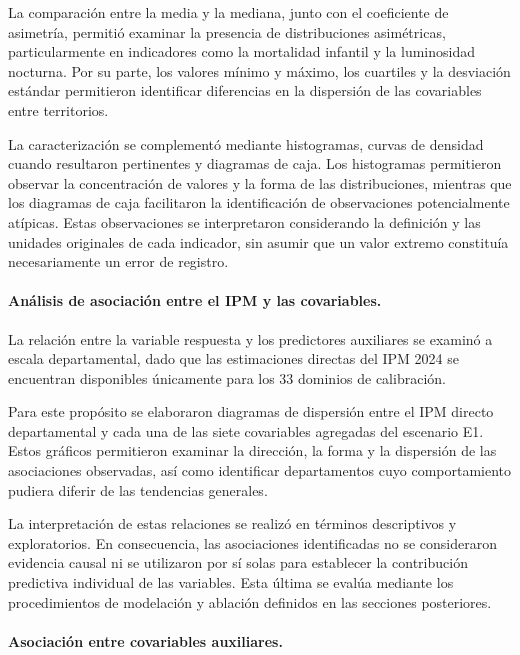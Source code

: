 La comparación entre la media y la mediana, junto con el coeficiente de asimetría, permitió examinar la presencia de distribuciones asimétricas, particularmente en indicadores como la mortalidad infantil y la luminosidad nocturna. Por su parte, los valores mínimo y máximo, los cuartiles y la desviación estándar permitieron identificar diferencias en la dispersión de las covariables entre territorios.

La caracterización se complementó mediante histogramas, curvas de densidad cuando resultaron pertinentes y diagramas de caja. Los histogramas permitieron observar la concentración de valores y la forma de las distribuciones, mientras que los diagramas de caja facilitaron la identificación de observaciones potencialmente atípicas. Estas observaciones se interpretaron considerando la definición y las unidades originales de cada indicador, sin asumir que un valor extremo constituía necesariamente un error de registro.

\paragraph{Análisis de asociación entre el IPM y las covariables.}

La relación entre la variable respuesta y los predictores auxiliares se examinó a escala departamental, dado que las estimaciones directas del IPM 2024 se encuentran disponibles únicamente para los 33 dominios de calibración.

Para este propósito se elaboraron diagramas de dispersión entre el IPM directo departamental y cada una de las siete covariables agregadas del escenario E1. Estos gráficos permitieron examinar la dirección, la forma y la dispersión de las asociaciones observadas, así como identificar departamentos cuyo comportamiento pudiera diferir de las tendencias generales.

La interpretación de estas relaciones se realizó en términos descriptivos y exploratorios. En consecuencia, las asociaciones identificadas no se consideraron evidencia causal ni se utilizaron por sí solas para establecer la contribución predictiva individual de las variables. Esta última se evalúa mediante los procedimientos de modelación y ablación definidos en las secciones posteriores.

\paragraph{Asociación entre covariables auxiliares.}

